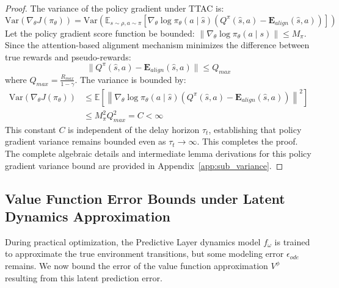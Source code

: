 \documentclass[manuscript, screen, review]{jair}
\begin{document}
\begin{proof}
The variance of the policy gradient under TTAC is:
\begin{equation*}
    \text{Var}(\nabla_\theta J(\pi_\theta)) = \text{Var}\left( \mathbb{E}_{s \sim \rho, a \sim \pi} \left[ \nabla_\theta \log \pi_\theta(a \mid \hat{s}) \left( Q^{\pi}(\hat{s}, a) - \mathbf{E}_{align}(\hat{s}, a) \right) \right] \right)
\end{equation*}
Let the policy gradient score function be bounded: $\|\nabla_\theta \log \pi_\theta(a \mid s)\| \le M_\pi$. Since the attention-based alignment mechanism minimizes the difference between true rewards and pseudo-rewards:
\begin{equation*}
    \| Q^\pi(\hat{s}, a) - \mathbf{E}_{align}(\hat{s}, a) \| \le Q_{max}
\end{equation*}
where $Q_{max} = \frac{R_{max}}{1-\gamma}$. The variance is bounded by:
\begin{align*}
    \text{Var}(\nabla_\theta J(\pi_\theta)) &\le \mathbb{E} \left[ \left\| \nabla_\theta \log \pi_\theta(a \mid \hat{s}) \left( Q^{\pi}(\hat{s}, a) - \mathbf{E}_{align}(\hat{s}, a) \right) \right\|^2 \right] \\
    &\le M_\pi^2 Q_{max}^2 = C < \infty
\end{align*}
This constant $C$ is independent of the delay horizon $\tau_t$, establishing that policy gradient variance remains bounded even as $\tau_t \to \infty$. This completes the proof. The complete algebraic details and intermediate lemma derivations for this policy gradient variance bound are provided in Appendix~\ref{app:sub_variance}.
\end{proof}

\subsection{Value Function Error Bounds under Latent Dynamics Approximation}
During practical optimization, the Predictive Layer dynamics model $f_\omega$ is trained to approximate the true environment transitions, but some modeling error $\epsilon_{ode}$ remains. We now bound the error of the value function approximation $V^\phi$ resulting from this latent prediction error.
\end{document}
